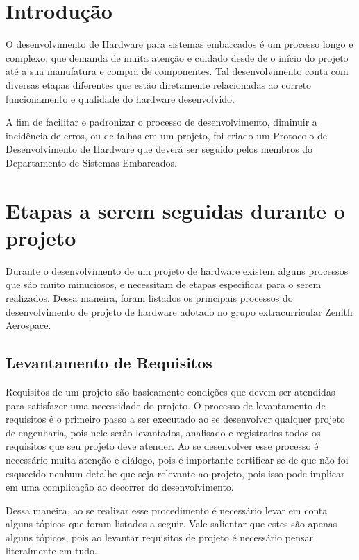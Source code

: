 \section{Introdução}

O desenvolvimento de Hardware para sistemas embarcados é um processo longo e complexo, que demanda de muita atenção e cuidado desde de o início do projeto até a sua manufatura  e compra de componentes. Tal desenvolvimento conta com diversas etapas diferentes que estão diretamente relacionadas ao correto funcionamento e qualidade do hardware desenvolvido.

A fim de facilitar e padronizar o processo de desenvolvimento, diminuir a incidência de erros, ou de falhas em um projeto, foi criado um Protocolo de Desenvolvimento de Hardware que deverá ser seguido pelos membros do Departamento de Sistemas Embarcados.

\section{Etapas a serem seguidas durante o projeto}

Durante o desenvolvimento de um projeto de hardware existem alguns processos que são muito minuciosos, e necessitam de etapas específicas para o serem realizados. Dessa maneira, foram listados os principais processos do desenvolvimento de projeto de hardware adotado no grupo extracurricular Zenith Aerospace.

\subsection{Levantamento de Requisitos}

Requisitos de um projeto são basicamente condições que devem ser atendidas para satisfazer uma necessidade  do projeto. O processo de levantamento de requisitos é o primeiro passo a ser executado ao se desenvolver qualquer  projeto de engenharia, pois nele serão levantados, analisado e registrados todos os requisitos que seu projeto deve atender.  Ao se desenvolver esse processo é necessário muita atenção e diálogo, pois é importante  certificar-se de que não foi esquecido nenhum detalhe  que seja relevante ao projeto, pois isso pode implicar em uma complicação ao decorrer do desenvolvimento.

Dessa maneira, ao  se realizar esse procedimento é necessário levar em conta alguns tópicos que foram listados a seguir. Vale salientar que estes são apenas alguns tópicos, pois ao levantar requisitos de projeto é necessário pensar literalmente em tudo.

